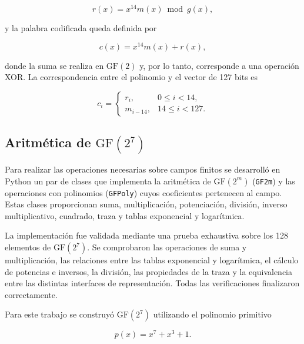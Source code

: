 \documentclass[10pt,a4paper]{article}
\begin{document}
\begin{equation}
    r(x)=x^{14}m(x)\bmod g(x),
    \label{eq:convencion-resto-bch}
\end{equation}

y la palabra codificada queda definida por

\begin{equation}
    c(x)=x^{14}m(x)+r(x),
    \label{eq:convencion-codeword-bch}
\end{equation}

donde la suma se realiza en $\mathrm{GF}(2)$ y, por lo tanto, corresponde a una
operación XOR. La correspondencia entre el polinomio y el vector de 127 bits es

\begin{equation}
    c_i=
    \begin{cases}
        r_i, & 0\leq i<14,\\
        m_{i-14}, & 14\leq i<127.
    \end{cases}
    \label{eq:convencion-mapeo-codeword}
\end{equation}

\subsection{Aritmética de \texorpdfstring{$\mathrm{GF}(2^7)$}{GF(2 elevado a 7)}}

Para realizar las operaciones necesarias sobre campos finitos se desarrolló
en Python un par de clases que implementa la aritmética de $\mathrm{GF}(2^m)$ 
(\texttt{GF2m}) y las operaciones con polinomios (\texttt{GFPoly}) 
cuyos coeficientes pertenecen al campo. Estas clases proporcionan suma, 
multiplicación, potenciación, división, inverso multiplicativo, cuadrado, 
traza y tablas exponencial y logarítmica.

La implementación fue validada mediante una prueba exhaustiva sobre los 128
elementos de $\mathrm{GF}(2^7)$. Se comprobaron las operaciones de suma y
multiplicación, las relaciones entre las tablas exponencial y logarítmica, el
cálculo de potencias e inversos, la división, las propiedades de la traza y la
equivalencia entre las distintas interfaces de representación. Todas las
verificaciones finalizaron correctamente.

Para este trabajo se construyó $\mathrm{GF}(2^7)$ utilizando el polinomio
primitivo

\begin{equation}
    p(x)=x^7+x^3+1.
    \label{eq:polinomio-primitivo-gf27-modelo}
\end{equation}
\end{document}

